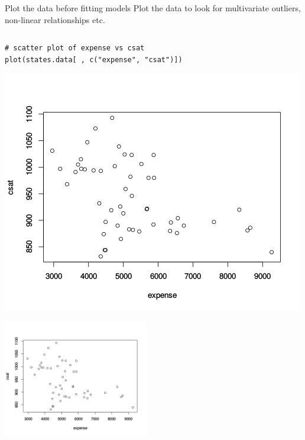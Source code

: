 \documentclass[table,smaller]{beamer}
\begin{document}
\begin{frame}[fragile,label=sec-2-2]{Plot the data before fitting models}
 Plot the data to look for multivariate outliers, non-linear relationships etc.

\begin{columns}  \begin{block}{}
\begin{verbatim}
# scatter plot of expense vs csat
plot(states.data[ , c("expense", "csat")])
\end{verbatim}

\includegraphics[width=.9\linewidth]{images/statesCorr1.png}

\includegraphics[width=2.5in]{images/statesCorr1.png}

\end{block} \end{columns}
\end{frame}
\end{document}
